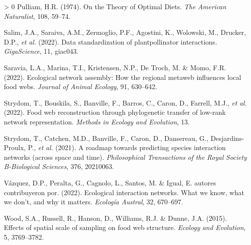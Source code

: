 \documentclass[10pt,oneside]{article}
\newlength{\cslhangindent}
\newenvironment{CSLReferences}[3] %
 {%
  \setlength{\parindent}{0pt}
  \ifodd #1 \everypar{\setlength{\hangindent}{\cslhangindent}}\ignorespaces\fi
  \ifnum #2 > 0
  \setlength{\parskip}{#2\baselineskip}
  \fi
 }%
 {}
\begin{document}
\begin{CSLReferences}{1}{0}
\leavevmode\hypertarget{ref-Pulliam1974Theory}{}%
Pulliam, H.R. (1974). On the Theory of Optimal Diets. \emph{The American
Naturalist}, 108, 59--74.

\leavevmode\hypertarget{ref-Salim2022DatSta}{}%
Salim, J.A., Saraiva, A.M., Zermoglio, P.F., Agostini, K., Wolowski, M.,
Drucker, D.P., \emph{et al.} (2022). Data standardization of
plantpollinator interactions. \emph{GigaScience}, 11, giac043.

\leavevmode\hypertarget{ref-Saravia2022Ecological}{}%
Saravia, L.A., Marina, T.I., Kristensen, N.P., De Troch, M. \& Momo,
F.R. (2022). Ecological network assembly: How the regional metaweb
influences local food webs. \emph{Journal of Animal Ecology}, 91,
630--642.

\leavevmode\hypertarget{ref-Strydom2022Food}{}%
Strydom, T., Bouskila, S., Banville, F., Barros, C., Caron, D., Farrell,
M.J., \emph{et al.} (2022). Food web reconstruction through phylogenetic
transfer of low-rank network representation. \emph{Methods in Ecology
and Evolution}, 13.

\leavevmode\hypertarget{ref-Strydom2021Roadmapa}{}%
Strydom, T., Catchen, M.D., Banville, F., Caron, D., Dansereau, G.,
Desjardins-Proulx, P., \emph{et al.} (2021). A roadmap towards
predicting species interaction networks (across space and time).
\emph{Philosophical Transactions of the Royal Society B-Biological
Sciences}, 376, 20210063.

\leavevmode\hypertarget{ref-VazquezSS2022EcoInt}{}%
Vázquez, D.P., Peralta, G., Cagnolo, L., Santos, M. \& Igual, E. autores
contribuyeron por. (2022). Ecological interaction networks. What we
know, what we don't, and why it matters. \emph{Ecología Austral}, 32,
670--697.

\leavevmode\hypertarget{ref-Wood2015Effects}{}%
Wood, S.A., Russell, R., Hanson, D., Williams, R.J. \& Dunne, J.A.
(2015). Effects of spatial scale of sampling on food web structure.
\emph{Ecology and Evolution}, 5, 3769--3782.

\end{CSLReferences}
\end{document}
